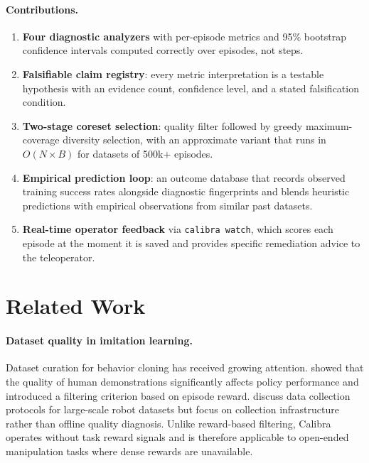 \documentclass[10pt,twocolumn]{article}
\begin{document}
\paragraph{Contributions.}
\begin{enumerate}[leftmargin=*,nosep]
  \item \textbf{Four diagnostic analyzers} with per-episode metrics and 95\%
    bootstrap confidence intervals computed correctly over episodes, not steps.
  \item \textbf{Falsifiable claim registry}: every metric interpretation is a
    testable hypothesis with an evidence count, confidence level, and a
    stated falsification condition.
  \item \textbf{Two-stage coreset selection}: quality filter followed by
    greedy maximum-coverage diversity selection, with an approximate variant
    that runs in $O(N \times B)$ for datasets of 500k+ episodes.
  \item \textbf{Empirical prediction loop}: an outcome database that records
    observed training success rates alongside diagnostic fingerprints and
    blends heuristic predictions with empirical observations from similar past
    datasets.
  \item \textbf{Real-time operator feedback} via \texttt{calibra watch}, which
    scores each episode at the moment it is saved and provides specific
    remediation advice to the teleoperator.
\end{enumerate}

\section{Related Work}
\label{sec:related}

\paragraph{Dataset quality in imitation learning.}
Dataset curation for behavior cloning has received growing attention.
\citet{robomimic2021} showed that the quality of human demonstrations
significantly affects policy performance and introduced a filtering criterion
based on episode reward.
\citet{droid2024} discuss data collection protocols for large-scale robot
datasets but focus on collection infrastructure rather than offline quality
diagnosis.
Unlike reward-based filtering, Calibra operates without task reward signals
and is therefore applicable to open-ended manipulation tasks where dense
rewards are unavailable.
\end{document}

